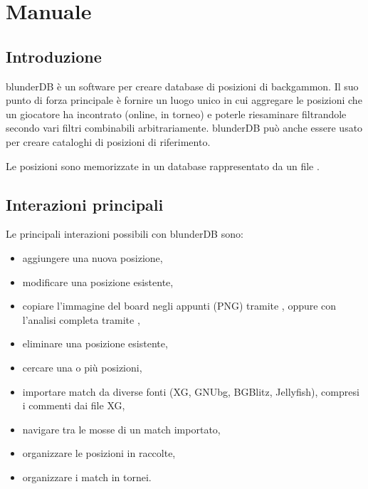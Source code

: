\documentclass[letterpaper,10pt,italian]{sphinxmanual}
\begin{document}
\sphinxstepscope


\section{Manuale}
\label{\detokenize{manuel:manuel}}\label{\detokenize{manuel:id1}}\label{\detokenize{manuel::doc}}

\subsection{Introduzione}
\label{\detokenize{manuel:introduction}}
\sphinxAtStartPar
blunderDB è un software per creare database di posizioni di backgammon. Il suo punto di forza principale è fornire un luogo unico in cui aggregare le posizioni che un giocatore ha incontrato (online, in torneo) e poterle riesaminare filtrandole secondo vari filtri combinabili arbitrariamente. blunderDB può anche essere usato per creare cataloghi di posizioni di riferimento.

\sphinxAtStartPar
Le posizioni sono memorizzate in un database rappresentato da un file .


\subsection{Interazioni principali}
\label{\detokenize{manuel:interactions-principales}}
\sphinxAtStartPar
Le principali interazioni possibili con blunderDB sono:
\begin{itemize}
\item {} 
\sphinxAtStartPar
aggiungere una nuova posizione,

\item {} 
\sphinxAtStartPar
modificare una posizione esistente,

\item {} 
\sphinxAtStartPar
copiare l’immagine del board negli appunti (PNG) tramite , oppure con l’analisi completa tramite ,

\item {} 
\sphinxAtStartPar
eliminare una posizione esistente,

\item {} 
\sphinxAtStartPar
cercare una o più posizioni,

\item {} 
\sphinxAtStartPar
importare match da diverse fonti (XG, GNUbg, BGBlitz, Jellyfish), compresi i commenti dai file XG,

\item {} 
\sphinxAtStartPar
navigare tra le mosse di un match importato,

\item {} 
\sphinxAtStartPar
organizzare le posizioni in raccolte,

\item {} 
\sphinxAtStartPar
organizzare i match in tornei.

\end{itemize}
\end{document}
